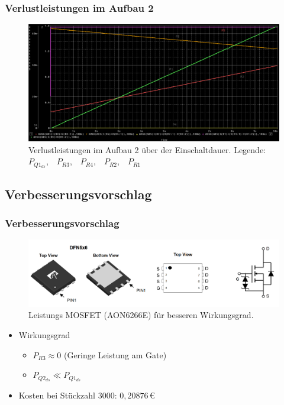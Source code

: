 \documentclass{beamer}
\begin{document}
	\begin{frame}
		\frametitle{Verlustleistungen im Aufbau 2}
		\begin{center}
			\begin{figure}[tbh]
				\centering
				\includegraphics[width=1\linewidth]{medien/V2-3.png}
				\caption[Verlustleistungen Aufbau 2]{Verlustleistungen im Aufbau 2 über der Einschaltdauer. Legende:~\color{green}~$P_{Q1_{ds}}$,~\color{red}~$P_{R3}$,~\color{orange}~$P_{R4}$,~\color{yellow}~$P_{R2}$,~\color{magenta}~$P_{R1}$}
			\end{figure}
		\end{center}
	\end{frame}
	\subsection{Verbesserungsvorschlag}
	\begin{frame}
		\frametitle{Verbesserungsvorschlag}
		\begin{center}
			\begin{figure}[tbh]
				\centering
				\includegraphics[width=1\linewidth]{medien/V3-4.png}
				\caption[MOSFET]{Leistungs MOSFET (AON6266E) für besseren Wirkungsgrad.}
			\end{figure}
		\end{center}
		\begin{itemize}
			\item{Wirkungsgrad}
			\begin{itemize}
				\item{$P_{R3} \approx 0$ (Geringe Leistung am Gate)}
				\item{$P_{Q2_{ds}} \ll P_{Q1_{ds}}$}
			\end{itemize}
			\item{Kosten bei Stückzahl 3000: $0,20876\,$\euro}
		\end{itemize}
	\end{frame}
\end{document}
